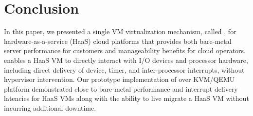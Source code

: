 
\section{Conclusion}
\vspace{-0.05in}

In this paper, we presented a single VM virtualization 
mechanism, called \sna, for hardware-as-a-service (HaaS) cloud platforms
that provides both bare-metal server performance for customers
and manageability benefits for cloud operators.
\na enables a HaaS VM to directly interact with I/O devices and 
processor hardware, including direct delivery of device,
timer, and inter-processor interrupts, without hypervisor intervention.
Our prototype implementation of \na over KVM/QEMU platform 
demonstrated close to bare-metal performance and
interrupt delivery latencies for HaaS VMs along with the
ability to live migrate a HaaS VM without incurring 
additional downtime. 
